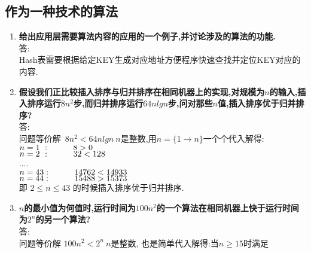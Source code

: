 \subsection{作为一种技术的算法}
\begin{enumerate} %
\item
\textbf{给出应用层需要算法内容的应用的一个例子,并讨论涉及的算法的功能.}
\\答:
\\Hash表需要根据给定KEY生成对应地址方便程序快速查找并定位KEY对应的内容.
\item
\textbf{假设我们正比较插入排序与归并排序在相同机器上的实现,对规模为$n$的输入,插入排序运行$8n^2$步,而归并排序运行$64nlgn$步,问对那些$n$值,插入排序优于归并排序?}
\\答:
\\问题等价解\ $8n^2 < 64nlgn  \ n$是整数,用$n=\{1\to n\}$一个个代入解得:
\\ \hspace*{10 mm}$n=1\ :\hspace{10 mm}  8>0$
\\ \hspace*{10 mm}$n=2\ :\hspace{10 mm} 32<128$
\\ \hspace*{15 mm} ....
\\ \hspace*{10 mm}$n=43:\hspace{10 mm} 14762<14933$
\\ \hspace*{10 mm}$n=44:\hspace{10 mm} 15488>15373$
\\即 $2\leq n \leq 43$ 的时候插入排序优于归并排序.
\item
\textbf{$n$的最小值为何值时,运行时间为$100n^2$的一个算法在相同机器上快于运行时间为$2^n$的另一个算法?}
\\答:
\\问题等价解 $100n^2 < 2^n \ n$是整数, 也是简单代入解得:当$n \geq 15$时满足

\end{enumerate}
